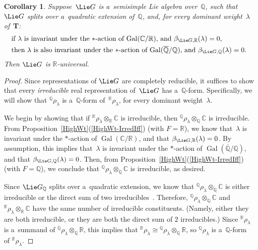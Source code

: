\documentclass[pdftex]{sigma}
\DeclareMathOperator{\Gal}{Gal}
\numberwithin{equation}{section}
\newtheorem{cor}[prop]{Corollary}
\begin{document}
\begin{cor}
Suppose~$\Lie G$ is a~semisimple Lie algebra over~$\mathbb{Q}$, such that~$\Lie G$ splits over a~quadratic
extension of~$\mathbb{Q}$, and, for every dominant weight~$\lambda$ of~$\mathbf{T}$:
\begin{gather}
\begin{split}
& \text{if~$\lambda$ is invariant under the $*$-action of~$\Gal(\mathbb{C}/\mathbb{R})$, and $\beta_{\Lie G,\mathbb{R}}(\lambda) = 0$,}
\\
& \text{then~$\lambda$ is also invariant under the $*$-action of $\Gal(\overline{\mathbb{Q}}/\mathbb{Q})$, and
$\beta_{\Lie G,\mathbb{Q}}(\lambda) = 0$.}
\end{split}\label{SplitOverQuadIff-weight}
\end{gather}
Then $\Lie G$ is $\mathbb{R}$-universal.
\end{cor}

\begin{proof}
Since representations of $\Lie G$ are completely reducible, it suf\/f\/ices to show that every \emph{irreducible} real
representation of~$\Lie G$ has a~$\mathbb{Q}$-form.
Specif\/ically, we will show that ${}^\mathbb{Q} \rho_\lambda$ is a~$\mathbb{Q}$-form of~${}^\mathbb{R} \rho_\lambda$, for
every dominant weight~$\lambda$.

We begin by showing that if ${}^\mathbb{R} \rho_\lambda \otimes_\mathbb{R} \mathbb{C}$ is irreducible, then
${}^\mathbb{Q} \rho_\lambda \otimes_\mathbb{Q} \mathbb{C}$ is irreducible.
From Proposition~\ref{HighWt}(\ref{HighWt-IrredIff}) (with $F = \mathbb{R}$), we know that~$\lambda$ is invariant under the $*$-action
of $\Gal(\mathbb{C}/\mathbb{R})$, and that $\beta_{\Lie G,\mathbb{R}}(\lambda) = 0$.
By assumption, this implies that~$\lambda$ is invariant under the $*$-action of\/
$\Gal(\overline{\mathbb{Q}}/\mathbb{Q})$, and that $\beta_{\Lie G,\mathbb{Q}}(\lambda) = 0$.
Then, from Proposition~\ref{HighWt}(\ref{HighWt-IrredIff}) (with $F = \mathbb{Q}$), we conclude that ${}^\mathbb{Q} \rho_\lambda
\otimes_\mathbb{Q} \mathbb{C}$ is irreducible, as desired.

Since $\Lie G_\mathbb{Q}$ splits over a~quadratic extension, we know that ${}^\mathbb{Q} \rho_\lambda \otimes_\mathbb{Q}
\mathbb{C}$ is either irreducible or the direct sum of two irreducibles~\cite[Corollary~3.2(2)]{Morris-RRepsQForms}.
Therefore, ${}^\mathbb{Q} \rho_\lambda \otimes_\mathbb{Q} \mathbb{C}$ and ${}^\mathbb{R} \rho_\lambda \otimes_\mathbb{R}
\mathbb{C}$ have the same number of irreducible constituents.
(Namely, either they are both irreducible, or they are both the direct sum of $2$ irreducibles.) Since ${}^\mathbb{R}
\rho_\lambda$ is a~summand of ${}^\mathbb{Q} \rho_\lambda \otimes_\mathbb{Q} \mathbb{R}$, this implies that
${}^\mathbb{R} \rho_\lambda \cong {}^\mathbb{Q} \rho_\lambda \otimes_\mathbb{Q} \mathbb{R}$, so ${}^\mathbb{Q}
\rho_\lambda$ is a~$\mathbb{Q}$-form of ${}^\mathbb{R} \rho_\lambda$.
\end{proof}
\end{document}
